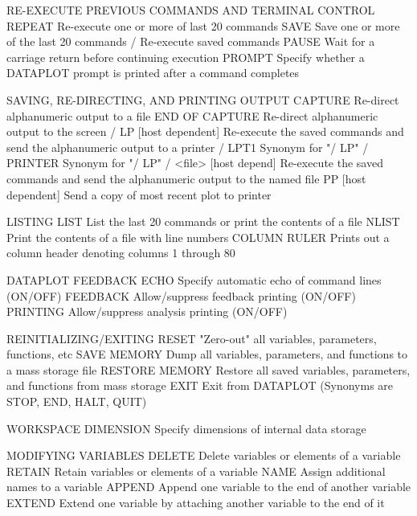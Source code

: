 RE-EXECUTE PREVIOUS COMMANDS AND TERMINAL CONTROL
   REPEAT                  Re-execute one or more of last 20 commands
   SAVE                    Save one or more of the last 20 commands
   /                       Re-execute saved commands
   PAUSE                   Wait for a carriage return before
                           continuing execution
   PROMPT                  Specify whether a DATAPLOT prompt is
                           printed after a command completes
 
SAVING, RE-DIRECTING, AND PRINTING OUTPUT
   CAPTURE                 Re-direct alphanumeric output to a file
   END OF CAPTURE          Re-direct alphanumeric output to the screen
   / LP  [host dependent]  Re-execute the saved commands and send the
                           alphanumeric output to a printer
   / LPT1                  Synonym for "/ LP"
   / PRINTER               Synonym for "/ LP"
   / <file> [host depend]  Re-execute the saved commands and send the
                           alphanumeric output to the named file
   PP  [host dependent]    Send a copy of most recent plot to printer
 
LISTING
   LIST                    List the last 20 commands or print the
                           contents of a file
   NLIST                   Print the contents of a file with line
                           numbers
   COLUMN RULER            Prints out a column header denoting columns
                           1 through 80
 
DATAPLOT FEEDBACK
   ECHO                    Specify automatic echo of command lines
                           (ON/OFF)
   FEEDBACK                Allow/suppress feedback printing (ON/OFF)
   PRINTING                Allow/suppress analysis printing (ON/OFF)
 
REINITIALIZING/EXITING
   RESET                   "Zero-out" all variables, parameters,
                           functions, etc
   SAVE MEMORY             Dump all variables, parameters, and
                           functions to a mass storage file
   RESTORE MEMORY          Restore all saved variables, parameters, and
                           functions from mass storage
   EXIT                    Exit from DATAPLOT (Synonyms are STOP, END,
                           HALT, QUIT)
 
WORKSPACE
   DIMENSION               Specify dimensions of internal data storage
 
MODIFYING VARIABLES
   DELETE                  Delete variables or elements of a variable
   RETAIN                  Retain variables or elements of a variable
   NAME                    Assign additional names to a variable
   APPEND                  Append one variable to the end of another
                           variable
   EXTEND                  Extend one variable by attaching another
                           variable to the end of it
 
